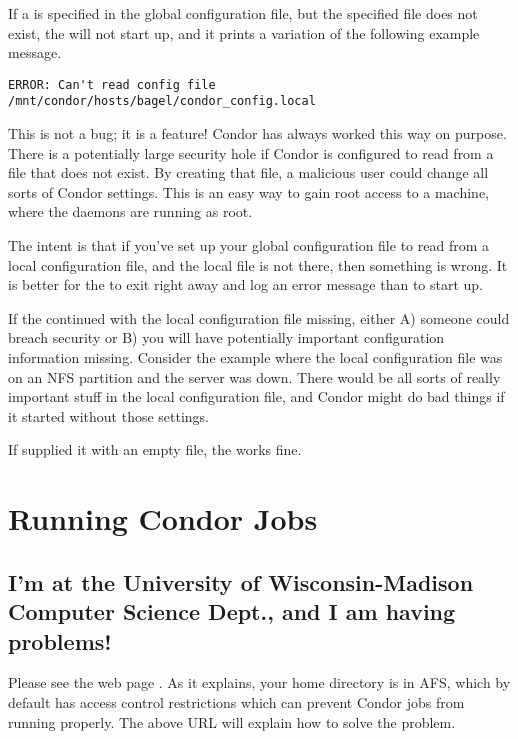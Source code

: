 If a  
is specified in the global configuration file,
but the specified file does not exist,
the  will not start up, and it prints a variation
of the following example message.

\begin{verbatim}
ERROR: Can't read config file /mnt/condor/hosts/bagel/condor_config.local
\end{verbatim}

This is not a bug; it is a feature!
Condor has always worked this way on purpose.
There is a potentially
large security hole if Condor is configured to read from a file that
does not exist.
By creating that file, a malicious user could
change all sorts of Condor settings.
This is an easy way
to gain root access to a machine,
where the daemons are running as root.

The intent is that
if you've set up your global configuration file to read
from a local configuration file, and the local file is not there,
then something is wrong.
It is better for the  to exit right away and
log an error message than to start up.

If the  continued with the local configuration file
missing, either A) someone could breach security or B) you will have
potentially important configuration information missing.
Consider the example where the local configuration file was on an NFS
partition and the server was down. 
There would be all sorts of
really important stuff in the local configuration file,
and Condor might do bad things if it started without those settings.  

If supplied it with an empty file, the  works fine.



\section{Running Condor Jobs}

\subsection*{I'm at the University of Wisconsin-Madison Computer Science Dept., and I am having problems!}

Please see the web page .
As
it explains, your home directory is in AFS, which by default has
access control restrictions which can prevent Condor jobs from running
properly.
The above URL will explain how to solve the problem.

